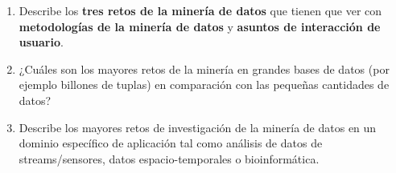 \documentclass{article}
\begin{document}
\begin{enumerate}
\pagebreak
\item Describe los \textbf{tres retos de la minería de datos} que tienen que ver
con \textbf{metodologías de la minería de datos} y \textbf{asuntos de
interacción de usuario}.

\pagebreak
\item ¿Cuáles son los mayores retos de la minería en grandes bases de datos (por
ejemplo billones de tuplas) en comparación con las pequeñas cantidades de datos?

\pagebreak
\item Describe los mayores retos de investigación de la minería de datos en un
dominio específico de aplicación tal como análisis de datos de streams/sensores,
datos espacio-temporales o bioinformática.

\end{enumerate}
\end{document}
